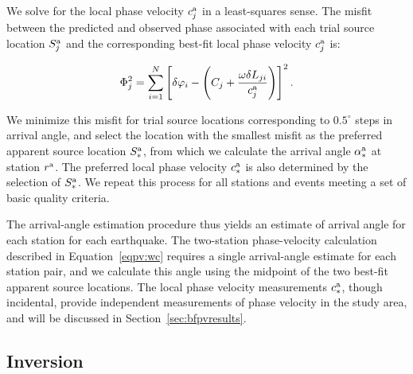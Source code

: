 \documentclass[12pt,oneside]{book}
\newcommand{\degree}[1]{\mbox{$#1^{\circ}$}}
\begin{document}
We solve for the local phase velocity $c^{\rm{a}}_j$ in a least-squares sense. The misfit between the predicted and observed phase associated with each trial source location $S^{\rm{a}}_j$ and the corresponding best-fit local phase velocity $c^{\rm{a}}_j$ is:
\begin{linenomath*}
\begin{equation}\label{eqpv:bfaa}
\Phi^2_j = \sum_{i=1}^{N} \left[ \delta \varphi_i - \left( C_j + \frac{\omega \delta L_{ji}}{c^{\rm{a}}_j}\right)  \right]^2.
\end{equation}
\end{linenomath*}
We minimize this misfit for trial source locations corresponding to \degree{0.5} steps in arrival angle, and select the location with the smallest misfit as the preferred apparent source location $S^{\rm{a}}_{\ast}$, from which we calculate the arrival angle $\alpha^{\rm{a}}_{\ast}$ at station $r^{\rm{a}}$. The preferred local phase velocity $c^{\rm{a}}_{\ast}$ is also determined by the selection of $S^{\rm{a}}_{\ast}$. We repeat this process for all stations and events meeting a set of basic quality criteria. 

The arrival-angle estimation procedure thus yields an estimate of arrival angle for each station for each earthquake. The two-station phase-velocity calculation described in Equation~\ref{eqpv:wc} requires a single arrival-angle estimate for each station pair, and we calculate this angle using the midpoint of the two best-fit apparent source locations. The local phase velocity measurements $c^{\rm{a}}_{\ast}$, though incidental, provide independent measurements of phase velocity in the study area, and will be discussed in Section~\ref{sec:bfpvresults}. 

\subsection{Inversion}
\end{document}
